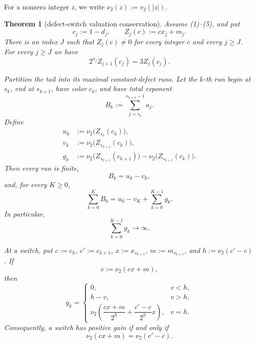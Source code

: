 \documentclass[11pt]{article}
\newtheorem{theorem}{Theorem}
\begin{document}
For a nonzero integer $z$, we write $\nu_2(z):=v_2(|z|)$.

\begin{theorem}[defect-switch valuation conservation]
Assume (1)--(5), and put
\[
  c_j:=1-d_j,
  \qquad
  Z_j(c):=cx_j+m_j.
  \tag{10}
\]
There is an index $J$ such that $Z_j(c)\neq0$ for every integer $c$ and
every $j\geq J$.  For every $j\geq J$ we have
\[
\boxed{
  2^{a_j}Z_{j+1}(c_j)=3Z_j(c_j).}
  \tag{11}
\]

Partition the tail into its maximal constant-defect runs.  Let the $k$-th
run begin at $s_k$, end at $s_{k+1}$, have color $c_k$, and have total
exponent
\[
  B_k:=\sum_{j=s_k}^{s_{k+1}-1}a_j.
  \tag{12}
\]
Define
\[
\begin{aligned}
  u_k&:=\nu_2\bigl(Z_{s_k}(c_k)\bigr),\\
  v_k&:=\nu_2\bigl(Z_{s_{k+1}}(c_k)\bigr),\\
  g_k&:=\nu_2\bigl(Z_{s_{k+1}}(c_{k+1})\bigr)
       -\nu_2\bigl(Z_{s_{k+1}}(c_k)\bigr).
\end{aligned}
\tag{13}
\]
Then every run is finite,
\[
\boxed{B_k=u_k-v_k,}
\tag{14}
\]
and, for every $K\geq0$,
\[
\boxed{
  \sum_{k=0}^{K}B_k
  =u_0-v_K+\sum_{k=0}^{K-1}g_k.}
\tag{15}
\]
In particular,
\[
  \sum_{k=0}^{K-1}g_k\longrightarrow\infty.
  \tag{16}
\]

At a switch, put $c:=c_k$, $c':=c_{k+1}$,
$x:=x_{s_{k+1}}$, $m:=m_{s_{k+1}}$, and
$h:=\nu_2(c'-c)$.  If
\[
  v:=\nu_2(cx+m),
\]
then
\[
  g_k=
  \begin{cases}
    0,&v<h,\\
    h-v,&v>h,\\
    \nu_2\!\left(\dfrac{cx+m}{2^h}
      +\dfrac{c'-c}{2^h}x\right),&v=h.
  \end{cases}
  \tag{17}
\]
Consequently, a switch has positive gain if and only if
\[
  \nu_2(cx+m)=\nu_2(c'-c).
  \tag{18}
\]
\end{theorem}
\end{document}
